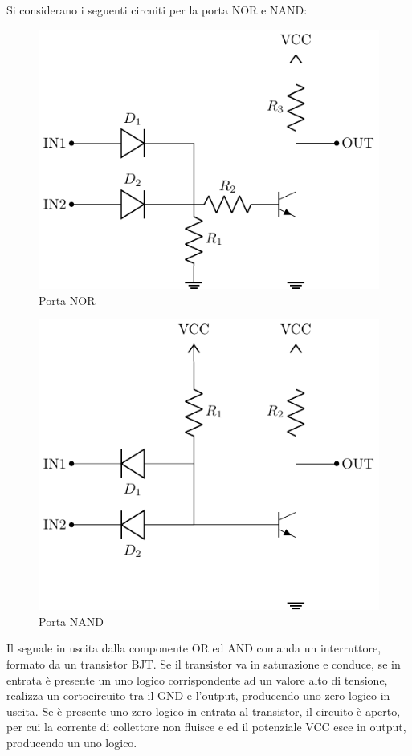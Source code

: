 \documentclass{article}
\numberwithin{equation}{subsection}
\begin{document}
Si considerano i seguenti circuiti per la porta NOR e NAND:
\begin{figure}[H]%
    \centering
    \includegraphics{circuito-nor.pdf}%
    \caption{Porta NOR}%
    \label{fig:circuito-nor}
\end{figure}
\begin{figure}[H]%
    \centering
    \includegraphics{circuito-nand.pdf}%
    \caption{Porta NAND}
    \label{fig:circuito-nand}
\end{figure}

Il segnale in uscita dalla componente OR ed AND comanda un interruttore, formato da un transistor BJT. Se il transistor va in saturazione e 
conduce, se in entrata è presente un uno logico corrispondente ad un valore alto di tensione, realizza un cortocircuito tra il GND e 
l'output, producendo uno zero logico in uscita. Se è presente uno zero logico in entrata al transistor, il circuito è aperto, per cui la corrente 
di collettore non fluisce e ed il potenziale VCC esce in output, producendo un uno logico. 
\end{document}
